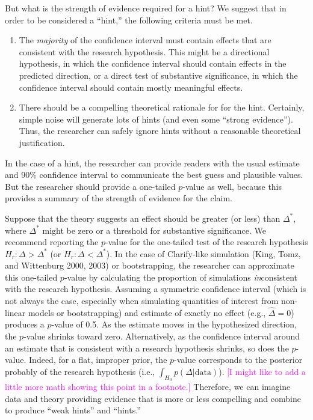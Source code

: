 \documentclass[12pt]{article}
\newcommand{\carlisle}[1]{\textcolor{magenta}{#1}}
\begin{document}
But what is the strength of evidence required for a hint? We suggest that in order to be considered a ``hint,'' the following criteria must be met.

\begin{enumerate}
\item The \textit{majority} of the confidence interval must contain effects that are consistent with the research hypothesis. This might be a directional hypothesis, in which the confidence interval should contain effects in the predicted direction, or a direct test of substantive significance, in which the confidence interval should contain mostly meaningful effects.
\item There should be a compelling theoretical rationale for for the hint. Certainly, simple noise will generate lots of hints (and even some ``strong evidence''). Thus, the researcher can safely ignore hints without a reasonable theoretical justification. 
\end{enumerate}

In the case of a hint, the researcher can provide readers with the usual estimate and 90\% confidence interval to communicate the best guess and plausible values. But the researcher should provide a one-tailed $p$-value as well, because this provides a summary of the strength of evidence for the claim.

Suppose that the theory suggests an effect should be greater (or less) than $\Delta^*$, where $\Delta^*$ might be zero or a threshold for substantive significance. We recommend reporting the $p$-value for the one-tailed test of the research hypothesis $H_r: \Delta > \Delta^*$ (or $H_r: \Delta < \Delta^*$). In the case of Clarify-like simulation (King, Tomz, and Wittenburg 2000, 2003) or bootstrapping, the researcher can approximate this one-tailed $p$-value by calculating the proportion of simulations \textit{in}consistent with the research hypothesis. Assuming a symmetric confidence interval (which is not always the case, especially when simulating quantities of interest from non-linear models or bootstrapping) and estimate of exactly no effect (e.g., $\hat{\Delta} = 0$) produces a $p$-value of 0.5. As the estimate moves in the hypothesized direction, the $p$-value shrinks toward zero. Alternatively, as the confidence interval around an estimate that is consistent with a research hypothesis shrinks, so does the $p$-value. Indeed, for a flat, improper prior, the $p$-value corresponds to the posterior probably of the research hypothesis (i.e., $\int_{H_0}p(\Delta | \text{data})$). \carlisle{[I might like to add a little more math showing this point in a footnote.]} Therefore, we can imagine data and theory providing evidence that is more or less compelling and combine to produce ``weak hints'' and ``hints.'' 
\end{document}
